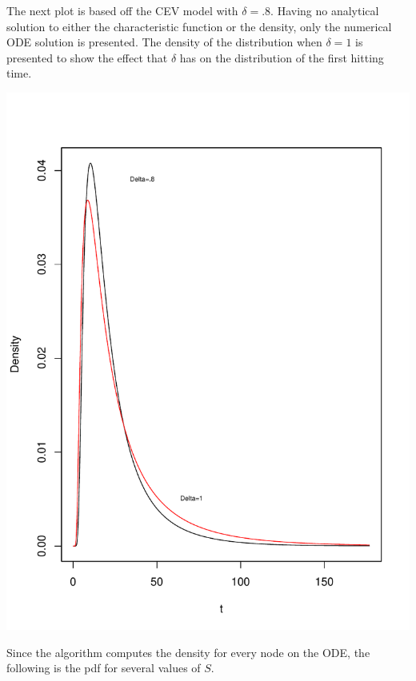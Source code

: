 \documentclass[12pt]{article}
\begin{document}
The next plot is based off the CEV model with \(\delta=.8\).  Having no analytical solution to either the characteristic function or the density, only the numerical ODE solution is presented.  The density of the distribution when \(\delta=1\) is presented to show the effect that \(\delta\) has on the distribution of the first hitting time.


\includegraphics{fig-007}

Since the algorithm computes the density for every node on the ODE, the following is the pdf for several values of \(S\).
\end{document}
